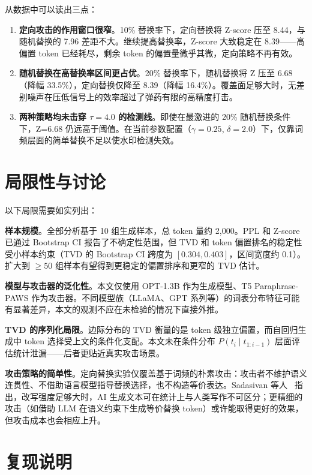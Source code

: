 \documentclass[11pt,a4paper]{article}
\begin{document}
从数据中可以读出三点：

\begin{enumerate}
    \item \textbf{定向攻击的作用窗口很窄}。10\% 替换率下，定向替换将 Z-score 压至 8.44，与随机替换的 7.96 差距不大。继续提高替换率，Z-score 大致稳定在 8.39——高偏置 token 已经耗尽，剩余 token 的偏置量微乎其微，定向策略不再有效。
    \item \textbf{随机替换在高替换率区间更占优}。20\% 替换率下，随机替换将 Z 压至 6.68（降幅 33.5\%），定向替换仅降至 8.39（降幅 16.4\%）。覆盖面足够大时，无差别噪声在压低信号上的效率超过了弹药有限的高精度打击。
    \item \textbf{两种策略均未击穿 $\tau=4.0$ 的检测线}。即使在最激进的 20\% 随机替换条件下，Z=6.68 仍远高于阈值。在当前参数配置（$\gamma=0.25$, $\delta=2.0$）下，仅靠词频层面的简单替换不足以使水印检测失效。
\end{enumerate}

\section{局限性与讨论}
以下局限需要如实列出：

\textbf{样本规模}。全部分析基于 10 组生成样本，总 token 量约 2,000。PPL 和 Z-score 已通过 Bootstrap CI 报告了不确定性范围，但 TVD 和 token 偏置排名的稳定性受小样本约束（TVD 的 Bootstrap CI 跨度为 $[0.304, 0.403]$，区间宽度约 0.1）。扩大到 $\geq 50$ 组样本有望得到更稳定的偏置排序和更窄的 TVD 估计。

\textbf{模型与攻击器的泛化性}。本文仅使用 OPT-1.3B 作为生成模型、T5 Paraphrase-PAWS 作为攻击器。不同模型族（LLaMA、GPT 系列等）的词表分布特征可能有显著差异，本文的观测不应在未检验的情况下直接外推。

\textbf{TVD 的序列化局限}。边际分布的 TVD 衡量的是 token 级独立偏置，而自回归生成中 token 选择受上文的条件化支配。本文未在条件分布 $P(t_i \mid t_{1:i-1})$ 层面评估统计泄漏——后者更贴近真实攻击场景。

\textbf{攻击策略的简单性}。定向替换实验仅覆盖基于词频的朴素攻击：攻击者不维护语义连贯性、不借助语言模型指导替换选择，也不构造等价表达。Sadasivan 等人~\cite{sadasivan2023detection} 指出，改写强度足够大时，AI 生成文本可在统计上与人类写作不可区分；更精细的攻击（如借助 LLM 在语义约束下生成等价替换 token）或许能取得更好的效果，但攻击成本也会相应上升。

\section{复现说明}
\end{document}
